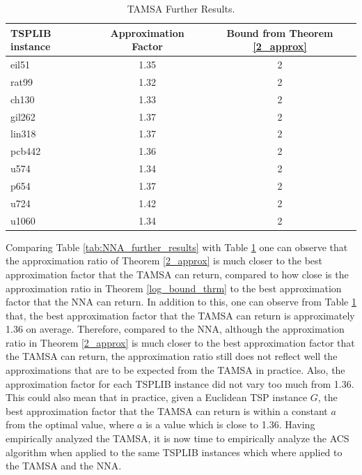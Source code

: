 \documentclass[12pt]{article}
\numberwithin{equation}{subsection}
\numberwithin{table}{subsection}
\numberwithin{algorithm}{subsection}
\numberwithin{figure}{subsection}
\begin{document}
\begin{table}[H]
    \caption{TAMSA Further Results.}
    \label{tab:Tamsa_further}
    \begin{tabular}{l|c|c} %
      \textbf{TSPLIB instance} & \textbf{Approximation Factor} & \textbf{Bound from Theorem \ref{2_approx}}\\
      \hline
    eil51 & 1.35 & 2\\
    rat99 & 1.32  & 2\\
    ch130 & 1.33 & 2  \\
    gil262 & 1.37 & 2  \\
    lin318 & 1.37   &  2  \\
    pcb442 & 1.36 & 2 \\
    u574 & 1.34  & 2 \\ 
    p654 & 1.37 & 2 \\
    u724 & 1.42 & 2 \\
    u1060 & 1.34 & 2  \\
    \end{tabular}
\end{table}
Comparing Table \ref{tab:NNA_further_results} with Table \ref{tab:Tamsa_further} one can observe that the approximation ratio of Theorem \ref{2_approx} is much closer to the best approximation factor that the TAMSA can return, compared to how close is the approximation ratio in Theorem \ref{log_bound_thrm} to the best approximation factor that the NNA can return. In addition to this, one can observe from Table \ref{tab:Tamsa_further} that, the best approximation factor that the TAMSA can return is approximately 1.36 on average. Therefore, compared to the NNA, although the approximation ratio in Theorem \ref{2_approx} is much closer to the best approximation factor that the TAMSA can return, the approximation ratio still does not reflect well the approximations that are to be expected from the TAMSA in practice. Also, the approximation factor for each TSPLIB instance did not vary too much from 1.36. This could also mean that in practice, given a Euclidean TSP instance $G$, the best approximation factor that the TAMSA can return is within a constant $a$ from the optimal value, where $a$ is a value which is close to 1.36. Having empirically analyzed the TAMSA, it is now time to empirically analyze the ACS algorithm when applied to the same TSPLIB instances which where applied to the TAMSA and the NNA.
\end{document}
